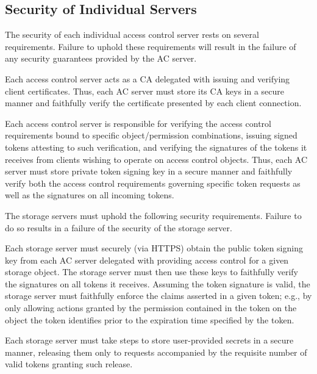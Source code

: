 \subsection{Security of Individual Servers}

The security of each individual access control server rests on several
requirements. Failure to uphold these requirements will result in the
failure of any security guarantees provided by the AC server.

\begin{packed_desc}
\item[Certificate Authority Role:] Each access control server acts as
  a CA delegated with issuing and verifying client certificates. Thus,
  each AC server must store its CA keys in a secure manner and
  faithfully verify the certificate presented by each client
  connection.
\item[Token Issuance and Verification:] Each access control server is
  responsible for verifying the access control requirements bound to
  specific object/permission combinations, issuing signed tokens
  attesting to such verification, and verifying the signatures of the
  tokens it receives from clients wishing to operate on access control
  objects. Thus, each AC server must store private token signing key
  in a secure manner and faithfully verify both the access control
  requirements governing specific token requests as well as the
  signatures on all incoming tokens.
\end{packed_desc}

The storage servers must uphold the following security
requirements. Failure to do so results in a failure of the security of
the storage server.

\begin{packed_desc}
\item[Token Verification:] Each storage server must securely (via
  HTTPS) obtain the public token signing key from each AC server
  delegated with providing access control for a given storage
  object. The storage server must then use these keys to faithfully
  verify the signatures on all tokens it receives. Assuming the token
  signature is valid, the storage server must faithfully enforce the
  claims asserted in a given token; e.g., by only allowing actions
  granted by the permission contained in the token on the object the
  token identifies prior to the expiration time specified by the
  token.
\item[Secure Storage:] Each storage server must take steps to store
  user-provided secrets in a secure manner, releasing them only to
  requests accompanied by the requisite number of valid tokens
  granting such release.
\end{packed_desc}

